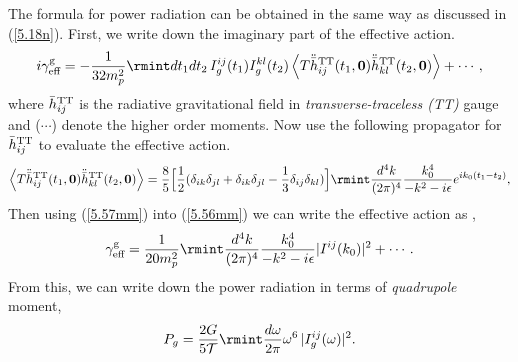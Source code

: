 The formula for power radiation can be obtained in the same way as discussed in (\ref{5.18n}). First, we write down the imaginary part of the effective action.
\begin{align}
    \begin{split}
        i\gamma_{\text{eff}}^{\text{g}}=-\frac{1}{32 m_p^2}\rmint dt_1 dt_2\, I^{ij}_{g}(t_1)I^{kl}_{g}(t_2)\,\Big\langle T\ddot{\Bar{h}}_{ij}^{\text{TT}}(t_1,\boldsymbol{0})\ddot{\Bar{h}}_{kl}^{\text{TT}}(t_2,\boldsymbol{0})\Big\rangle+\cdots,\label{5.56mm}
    \end{split}
\end{align}
where ${\Bar{h}}_{ij}^{\text{TT}}$ is the radiative gravitational field in \textit{transverse-traceless (TT)} gauge and ($\cdots$) denote the higher order moments. Now use the following propagator for ${\Bar{h}}_{ij}^{\text{TT}}$ \cite{Goldberger:2004jt} to evaluate the effective action.
\begin{align}
    \begin{split}
        \Big\langle T\ddot{\Bar{h}}_{ij}^{\text{TT}}(t_1,\boldsymbol{0})\ddot{\Bar{h}}_{kl}^{\text{TT}}(t_2,\boldsymbol{0})\Big\rangle=\frac{8}{5}\Big[\frac{1}{2}(\delta_{ik}\delta_{jl}+\delta_{ik}\delta_{jl}-\frac{1}{3}\delta_{ij}\delta_{kl})\Big]\rmint \frac{d^4k}{(2\pi)^4}\frac{k_0^4}{-k^2-i\epsilon}e^{ik_0(t_1-t_2)},\label{5.57mm}
    \end{split}
\end{align}
Then using (\ref{5.57mm}) into (\ref{5.56mm}) we can write the effective action as \cite{Goldberger:2004jt,Kuntz:2019zef},
\begin{align}
    \begin{split}
        \gamma_{\text{eff}}^{\text{g}}=\frac{1}{20m_p^2}\rmint \frac{d^4 k}{(2\pi)^4}\frac{k_0^4}{-k^2-i\epsilon}|I^{ij}(k_0)|^2+\cdots.
    \end{split}
\end{align}
From this, we can write down the  power radiation in terms of \textit{quadrupole} moment,
\begin{align}
    \begin{split}
        P_{g}=\frac{2G}{5\mathcal{T}}\rmint \frac{d\omega}{2\pi}\omega^6\,|I^{ij}_{g}(\omega)|^2.
    \end{split}
\end{align}
